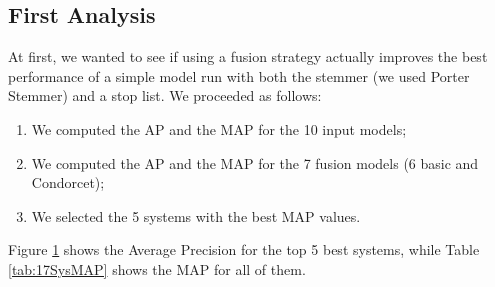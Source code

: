 	\subsection{First Analysis}
	At first, we wanted to see if using a fusion strategy actually improves the best performance of a simple model run with both the stemmer (we used Porter Stemmer) and a stop list.
	We proceeded as follows:
	\begin{enumerate}
		\item We computed the AP and the MAP for the 10 input models;
		\item We computed the AP and the MAP for the 7 fusion models (6 basic and Condorcet);
		\item We selected the 5 systems with the best MAP values.
	\end{enumerate}
	Figure \hyperref[fig:top5AP]{1} shows the Average Precision for the top 5 best systems, while Table \ref{tab:17SysMAP} shows the MAP for all of them.
	

